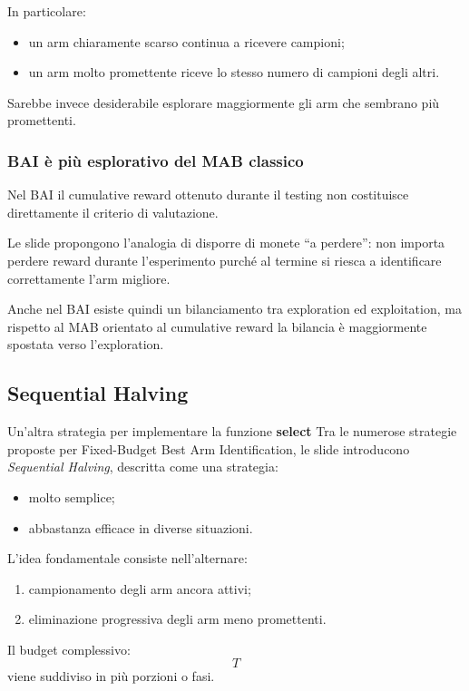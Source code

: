 In particolare:
\begin{itemize}
    \item un arm chiaramente scarso continua a ricevere campioni;
    \item un arm molto promettente riceve lo stesso numero di campioni degli altri.
\end{itemize}

Sarebbe invece desiderabile esplorare maggiormente gli arm che sembrano più promettenti.

\subsubsection{BAI è più esplorativo del MAB classico}

Nel BAI il cumulative reward ottenuto durante il testing non costituisce direttamente il criterio di valutazione.

Le slide propongono l'analogia di disporre di monete ``a perdere'': non importa perdere reward durante l'esperimento purché al termine si riesca a identificare correttamente l'arm migliore.

Anche nel BAI esiste quindi un bilanciamento tra exploration ed exploitation, ma rispetto al MAB orientato al cumulative reward la bilancia è maggiormente spostata verso l'exploration.

\subsection{Sequential Halving}
Un'altra strategia per implementare la funzione \textbf{select}
Tra le numerose strategie proposte per Fixed-Budget Best Arm Identification, le slide introducono \emph{Sequential Halving}, descritta come una strategia:
\begin{itemize}
    \item molto semplice;
    \item abbastanza efficace in diverse situazioni.
\end{itemize}

L'idea fondamentale consiste nell'alternare:
\begin{enumerate}
    \item campionamento degli arm ancora attivi;
    \item eliminazione progressiva degli arm meno promettenti.
\end{enumerate}

Il budget complessivo:
\[
T
\]
viene suddiviso in più porzioni o fasi.

